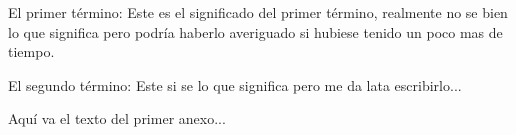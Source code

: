 \documentclass{iccmemoria}
\begin{document}




\begin{glosario}
  \item[El primer término:] Este es el significado del primer término, realmente no se bien lo que significa pero podría haberlo averiguado si hubiese tenido un poco mas de tiempo.
  \item[El segundo término:] Este si se lo que significa pero me da lata escribirlo...
\end{glosario}





\appendixpart

Aquí va el texto del primer anexo...

\end{document}
